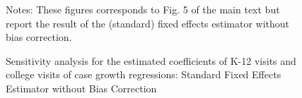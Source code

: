 \documentclass[9pt,twoside,lineno]{pnas-new}
\theoremstyle{definition}
\begin{document}
\begin{figure}[!ht]
{\begin{flushleft}
 \end{flushleft}}
\end{figure}

 
 \begin{figure}[ht]
  \caption{Sensitivity analysis for the estimated coefficients of K-12 visits and college visits of case growth regressions:  Standard Fixed Effects Estimator without Bias Correction \label{fig:sensitivity-fe-SI}}   
\hspace{3.5cm}
\vspace{-0.2cm}   { \scriptsize
\begin{flushleft}
Notes: These figures corresponds to Fig. 5 of the main text but report the result of the (standard) fixed effects estimator without bias correction.  
\end{flushleft}  }
\end{figure} 
\end{document}

